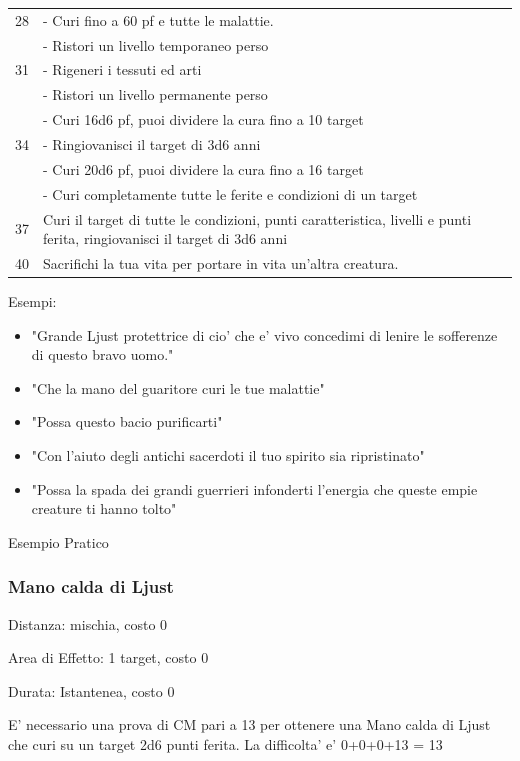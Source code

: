 \documentclass[a4paper,11pt,twoside,openany]{book}
\begin{document}
\begin{longtable}{L{3cm} L{13cm}}
28 &- Curi fino a 60 pf e tutte le malattie.\\
& - Ristori un livello temporaneo perso\\
31 & - Rigeneri i tessuti ed arti\\
& - Ristori un livello permanente perso\\
& - Curi 16d6 pf, puoi dividere la cura fino a 10 target\\
34 & - Ringiovanisci il target di 3d6 anni\\
& - Curi 20d6 pf, puoi dividere la cura fino a 16 target\\
& - Curi completamente tutte le ferite e condizioni di un target\\
37 & Curi il target di tutte le condizioni, punti caratteristica, livelli e punti ferita, ringiovanisci il target di 3d6 anni\\
40 & Sacrifichi la tua vita per portare in vita un’altra creatura.\\
\end{longtable}

\bigskip


Esempi:
\begin{itemize}
\item 
"Grande Ljust protettrice di cio' che e' vivo concedimi di lenire
le sofferenze di questo bravo uomo." 
\item 
"Che la mano del guaritore curi le tue malattie" 
\item 
"Possa questo bacio purificarti" 
\item 
"Con l'aiuto degli antichi sacerdoti il tuo spirito sia ripristinato" 
\item 
"Possa la spada dei grandi guerrieri infonderti l'energia che queste empie creature ti hanno tolto" 
\end{itemize}

\bigskip

Esempio Pratico

\subsubsection{Mano calda di Ljust}

Distanza: mischia, costo 0

Area di Effetto: 1 target, costo 0

Durata: Istantenea, costo 0

E’ necessario una prova di CM pari a 13 per ottenere una Mano calda di Ljust che curi su un target
2d6 punti ferita. La difficolta’ e’ 0+0+0+13 = 13
\end{document}
